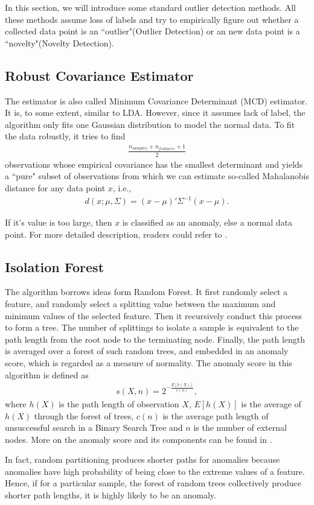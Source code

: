 \documentclass[english]{article}
\newenvironment{eqt}{\begin{equation}\begin{aligned}}{\end{aligned}\end{equation}}
\begin{document}
\par
In this section, we will introduce some standard outlier detection methods. All these methods assume loss of labels and try to empirically figure out whether a collected data point is an ``outlier"(Outlier Detection) or an new data point is a ``novelty"(Novelty Detection). 

\subsection{Robust Covariance Estimator}
\par
The estimator is also called Minimum Covariance Determinant (MCD) estimator. It is, to some extent, similar to LDA. However, since it assumes lack of label, the algorithm only fits one Gaussian distribution to model the normal data. To fit the data robustly, it tries to find 
\begin{eqt}
\frac{n_{\textit{samples}}+n_{\textit{features}}+1}{2}
\end{eqt}
observations whose empirical covariance has the smallest determinant and yields a ``pure" subset of observations from which we can estimate so-called Mahalanobis distance for any data point $x$, i.e., 
\begin{eqt}
\label{mahadist}
d(x; \mu, \Sigma) = (x-\mu)'\Sigma^{-1}(x-\mu).
\end{eqt}
\par
If it's value is too large, then $x$ is classified as an anomaly, else a normal data point. For more detailed description, readers could refer to \cite{robustcov}.


\subsection{Isolation Forest}
\par
The algorithm borrows ideas form Random Forest. It first randomly select a feature, and randomly select a splitting value between the maximum and minimum values of the selected feature. Then it recursively conduct this process to form a tree. The number of splittings to isolate a sample is equivalent to the path length from the root node to the terminating node. Finally, the path length is averaged over a forest of such random trees, and embedded in an anomaly score, which is regarded as a measure of normality. The anomaly score in this algorithm is defined as 
\begin{eqt}
s(X, n) = 2^{-\frac{E[h(X)]}{c(n)}},
\end{eqt}
where $h(X)$ is the path length of observation $X$, $E[h(X)]$ is the average of $h(X)$ through the forest of trees, $c(n)$ is the average path length of unsuccessful search in a Binary Search Tree and $n$ is the number of external nodes. More on the anomaly score and its components can be found in \cite{isolationforest}.
\par
In fact, random partitioning produces shorter paths for anomalies because anomalies have high probability of being close to the extreme values of a feature. Hence, if for a particular sample, the forest of random trees collectively produce shorter path lengths, it is highly likely to be an anomaly.
\end{document}
